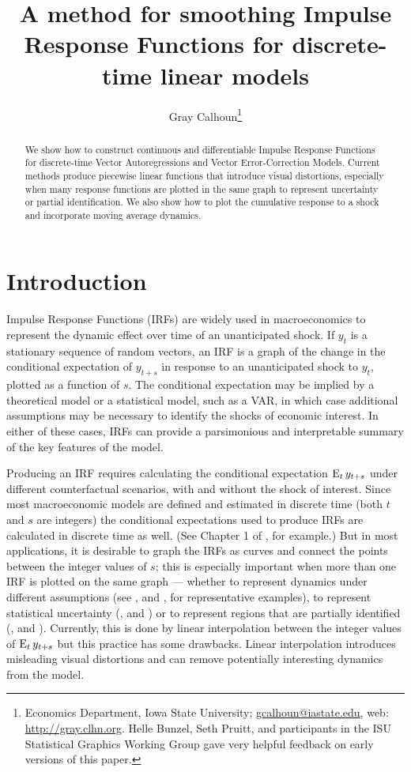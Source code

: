 \documentclass[12pt,fleqn]{article}
\title{A method for smoothing Impulse Response Functions for
  discrete-time linear models}
\author{Gray Calhoun\thanks{%
    Economics Department, Iowa State University;
    \protect\url{gcalhoun@iastate.edu},
    web: \protect\url{http://gray.clhn.org}.
    Helle Bunzel, Seth Pruitt, and participants in the ISU Statistical
    Graphics Working Group gave very helpful feedback on early
    versions of this paper.}}
\begin{document}
\maketitle
\begin{abstract}\noindent%
  We show how to construct continuous and differentiable Impulse
  Response Functions for discrete-time Vector Autoregressions and
  Vector Error-Correction Models. Current methods produce piecewise
  linear functions that introduce visual distortions, especially when
  many response functions are plotted in the same graph to represent
  uncertainty or partial identification. We also show how to plot the
  cumulative response to a shock and incorporate moving average
  dynamics.
\end{abstract}

\tableofcontents
\newpage

\section{Introduction}
\label{S1}

Impulse Response Functions (IRFs) are widely used in macroeconomics
to represent the dynamic effect over time of an unanticipated
shock. If $y_t$ is a stationary sequence of random vectors, an IRF
is a graph of the change in the conditional expectation of $y_{t+s}$
in response to an unanticipated shock to $y_t$, plotted as a function
of $s$. The conditional expectation may be implied by a theoretical
model or a statistical model, such as a VAR, in which case additional
assumptions may be necessary to identify the shocks of economic
interest. In either of these cases, IRFs can provide a parsimonious and
interpretable summary of the key features of the model.

Producing an IRF requires calculating the conditional expectation
$\operatorname{E}_t y_{t+s}$ under different counterfactual scenarios, with and
without the shock of interest. Since most macroeconomic models are
defined and estimated in discrete time (both $t$ and $s$ are integers)
the conditional expectations used to produce IRFs are calculated in
discrete time as well. (See Chapter 1 of \citealp{Ham:94}, for
example.) But in most applications, it is desirable to graph the IRFs
as curves and connect the points between the integer values of $s$;
this is especially important when more than one IRF is plotted on
the same graph --- whether to represent dynamics under different
assumptions (see \citealp{BeM:98}, and \citealp{StW:01}, for
representative examples), to represent statistical uncertainty
(\citealp{Kil:98}, and \citealp{SiZ:99}) or to represent regions that
are partially identified (\citealp{Uhl:05}, and
\citealp{InK:13}). Currently, this is done by linear interpolation
between the integer values of $\operatorname{E}_t y_{t+s}$ but this practice has
some drawbacks. Linear interpolation introduces misleading visual
distortions and can remove potentially interesting dynamics from the
model.
\end{document}
